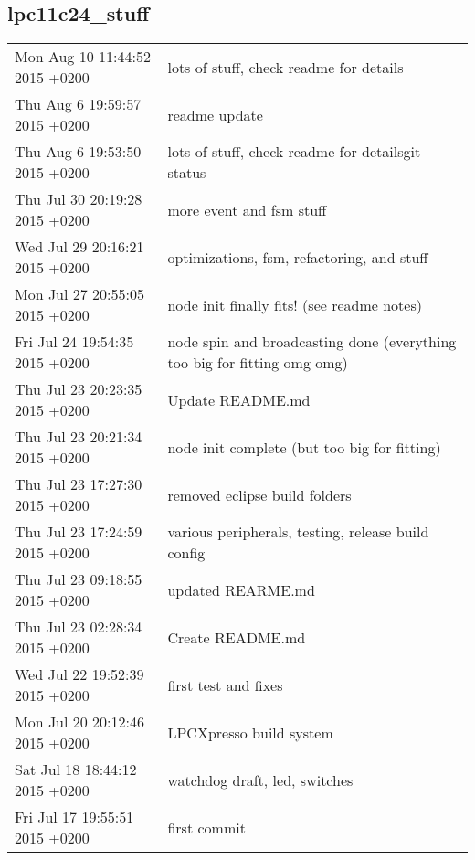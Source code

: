 \subsection{lpc11c24_stuff}

\begin{tabular}{ l l }
	\hline			
	Mon Aug 10 11:44:52 2015 +0200	& lots of stuff, check readme for details	\\
	Thu Aug 6 19:59:57 2015 +0200	& readme update	\\
	Thu Aug 6 19:53:50 2015 +0200	& lots of stuff, check readme for detailsgit status	\\
	Thu Jul 30 20:19:28 2015 +0200	& more event and fsm stuff	\\
	Wed Jul 29 20:16:21 2015 +0200	& optimizations, fsm, refactoring, and stuff	\\
	Mon Jul 27 20:55:05 2015 +0200	& node init finally fits! (see readme notes)	\\
	Fri Jul 24 19:54:35 2015 +0200	& node spin and broadcasting done (everything too big for fitting omg omg)	\\
	Thu Jul 23 20:23:35 2015 +0200	& Update README.md	\\
	Thu Jul 23 20:21:34 2015 +0200	& node init complete (but too big for fitting)	\\
	Thu Jul 23 17:27:30 2015 +0200	& removed eclipse build folders	\\
	Thu Jul 23 17:24:59 2015 +0200	& various peripherals, testing, release build config	\\
	Thu Jul 23 09:18:55 2015 +0200	& updated REARME.md	\\
	Thu Jul 23 02:28:34 2015 +0200	& Create README.md	\\
	Wed Jul 22 19:52:39 2015 +0200	& first test and fixes	\\
	Mon Jul 20 20:12:46 2015 +0200	& LPCXpresso build system	\\
	Sat Jul 18 18:44:12 2015 +0200	& watchdog draft, led, switches	\\
	Fri Jul 17 19:55:51 2015 +0200	& first commit	\\
	\hline  
\end{tabular}
